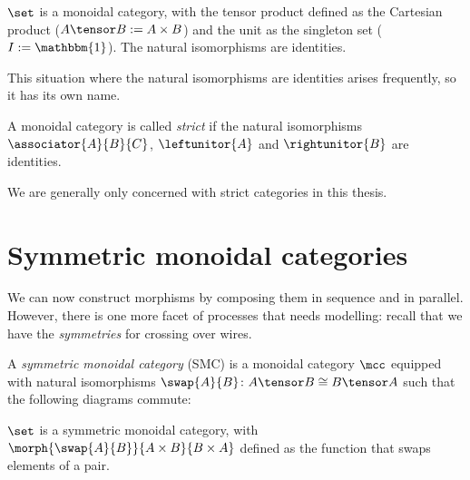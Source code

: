 \begin{example}
    \(\set\) is a monoidal category, with the tensor product defined as the
    Cartesian product (\(A \tensor B := A \times B\)) and the unit as the
    singleton set (\(I := \mathbbm{1}\)).
    The natural isomorphisms are identities.
\end{example}

This situation where the natural isomorphisms are identities arises frequently,
so it has its own name.

\begin{definition}
    A monoidal category is called \emph{strict} if the natural isomorphisms \(
        \associator{A}{B}{C}
    \), \(
        \leftunitor{A}
    \) and \(
        \rightunitor{B}
    \) are identities.
\end{definition}

We are generally only concerned with strict categories in this thesis.

\section{Symmetric monoidal categories}

We can now construct morphisms by composing them in sequence and in parallel.
However, there is one more facet of processes that needs modelling: recall that
we have the \emph{symmetries} for crossing over wires.

\begin{definition}
    \label{def:symmetric-monoidal-category}
    A \emph{symmetric monoidal category} (SMC) is a monoidal category \(\mcc\)
    equipped with natural isomorphisms \(
        \swap{A}{B} \colon A \tensor B \cong B \tensor A
    \) such that the following diagrams commute:
    \begin{center}
        
        

        \vspace{1em}

        
    \end{center}
\end{definition}

\begin{example}
    \(\set\) is a symmetric monoidal category, with \(
        \morph{\swap{A}{B}}{A \times B}{B \times A}
    \) defined as the function that swaps elements of a pair.
\end{example}


